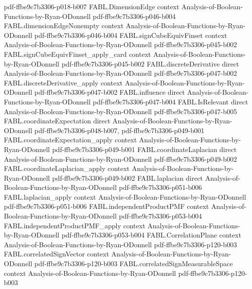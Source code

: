 \begin{theorem}
  {pdf-ffbe9c7b3306-p018-b007}
\proofstep
  {FABL.DimensionEdge}
  {context}
  {Analysis-of-Boolean-Functions-by-Ryan-ODonnell}
  {pdf-ffbe9c7b3306-p046-b004}
\proofstep
  {FABL.dimensionEdgeNonempty}
  {context}
  {Analysis-of-Boolean-Functions-by-Ryan-ODonnell}
  {pdf-ffbe9c7b3306-p046-b004}
\proofstep
  {FABL.signCubeEquivFinset}
  {context}
  {Analysis-of-Boolean-Functions-by-Ryan-ODonnell}
  {pdf-ffbe9c7b3306-p045-b002}
\proofstep
  {FABL.signCubeEquivFinset_apply_card}
  {context}
  {Analysis-of-Boolean-Functions-by-Ryan-ODonnell}
  {pdf-ffbe9c7b3306-p045-b002}
\proofstep
  {FABL.discreteDerivative}
  {direct}
  {Analysis-of-Boolean-Functions-by-Ryan-ODonnell}
  {pdf-ffbe9c7b3306-p047-b002}
\proofstep
  {FABL.discreteDerivative_apply}
  {context}
  {Analysis-of-Boolean-Functions-by-Ryan-ODonnell}
  {pdf-ffbe9c7b3306-p047-b002}
\proofstep
  {FABL.influence}
  {direct}
  {Analysis-of-Boolean-Functions-by-Ryan-ODonnell}
  {pdf-ffbe9c7b3306-p047-b004}
\proofstep
  {FABL.IsRelevant}
  {direct}
  {Analysis-of-Boolean-Functions-by-Ryan-ODonnell}
  {pdf-ffbe9c7b3306-p047-b005}
\proofstep
  {FABL.coordinateExpectation}
  {direct}
  {Analysis-of-Boolean-Functions-by-Ryan-ODonnell}
  {pdf-ffbe9c7b3306-p048-b007,
    pdf-ffbe9c7b3306-p049-b001}
\proofstep
  {FABL.coordinateExpectation_apply}
  {context}
  {Analysis-of-Boolean-Functions-by-Ryan-ODonnell}
  {pdf-ffbe9c7b3306-p049-b001}
\proofstep
  {FABL.coordinateLaplacian}
  {direct}
  {Analysis-of-Boolean-Functions-by-Ryan-ODonnell}
  {pdf-ffbe9c7b3306-p049-b002}
\proofstep
  {FABL.coordinateLaplacian_apply}
  {context}
  {Analysis-of-Boolean-Functions-by-Ryan-ODonnell}
  {pdf-ffbe9c7b3306-p049-b002}
\proofstep
  {FABL.laplacian}
  {direct}
  {Analysis-of-Boolean-Functions-by-Ryan-ODonnell}
  {pdf-ffbe9c7b3306-p051-b006}
\proofstep
  {FABL.laplacian_apply}
  {context}
  {Analysis-of-Boolean-Functions-by-Ryan-ODonnell}
  {pdf-ffbe9c7b3306-p051-b006}
\proofstep
  {FABL.independentProductPMF}
  {context}
  {Analysis-of-Boolean-Functions-by-Ryan-ODonnell}
  {pdf-ffbe9c7b3306-p053-b004}
\proofstep
  {FABL.independentProductPMF_apply}
  {context}
  {Analysis-of-Boolean-Functions-by-Ryan-ODonnell}
  {pdf-ffbe9c7b3306-p053-b004}
\proofstep
  {FABL.CorrelationPlane}
  {context}
  {Analysis-of-Boolean-Functions-by-Ryan-ODonnell}
  {pdf-ffbe9c7b3306-p120-b003}
\proofstep
  {FABL.correlatedSignVector}
  {context}
  {Analysis-of-Boolean-Functions-by-Ryan-ODonnell}
  {pdf-ffbe9c7b3306-p120-b003}
\proofstep
  {FABL.correlatedSignMeasurableSpace}
  {context}
  {Analysis-of-Boolean-Functions-by-Ryan-ODonnell}
  {pdf-ffbe9c7b3306-p120-b003}

\end{theorem}
